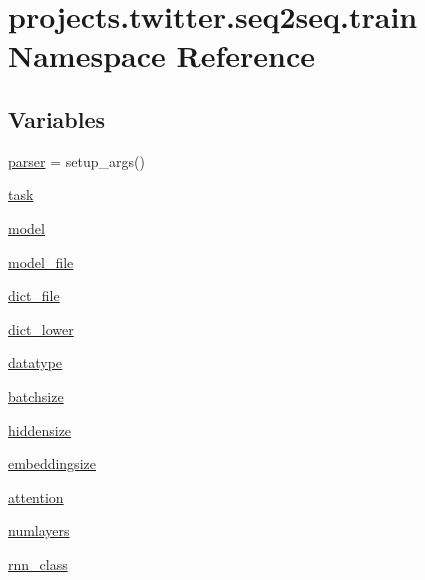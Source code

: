 \hypertarget{namespaceprojects_1_1twitter_1_1seq2seq_1_1train}{}\section{projects.\+twitter.\+seq2seq.\+train Namespace Reference}
\label{namespaceprojects_1_1twitter_1_1seq2seq_1_1train}
\subsection*{Variables}
\begin{DoxyCompactItemize}
\item 
\hyperlink{namespaceprojects_1_1twitter_1_1seq2seq_1_1train_a9e6a15f047bea69a82a938079cc0ba2f}{parser} = setup\+\_\+args()
\item 
\hyperlink{namespaceprojects_1_1twitter_1_1seq2seq_1_1train_a51cfbd999af26b059b5d5442c984be9b}{task}
\item 
\hyperlink{namespaceprojects_1_1twitter_1_1seq2seq_1_1train_a86896423f4d94c6bdd91ebced377ccec}{model}
\item 
\hyperlink{namespaceprojects_1_1twitter_1_1seq2seq_1_1train_a8bcf78f30268b40edf0e6df44b476a75}{model\+\_\+file}
\item 
\hyperlink{namespaceprojects_1_1twitter_1_1seq2seq_1_1train_ab00b37ad91423948f2d9bf2839b64316}{dict\+\_\+file}
\item 
\hyperlink{namespaceprojects_1_1twitter_1_1seq2seq_1_1train_ab2c85632a2a318851b9f675efc1ab4c3}{dict\+\_\+lower}
\item 
\hyperlink{namespaceprojects_1_1twitter_1_1seq2seq_1_1train_a9acdb1312a3787bcfb1e854c557fcaff}{datatype}
\item 
\hyperlink{namespaceprojects_1_1twitter_1_1seq2seq_1_1train_a80c8112773ded56fe439a3d97a3e790a}{batchsize}
\item 
\hyperlink{namespaceprojects_1_1twitter_1_1seq2seq_1_1train_a43dbbfc725c938ac40bbde95e0f85d5d}{hiddensize}
\item 
\hyperlink{namespaceprojects_1_1twitter_1_1seq2seq_1_1train_a069e63e4319bbbf8f442f20f21760c7e}{embeddingsize}
\item 
\hyperlink{namespaceprojects_1_1twitter_1_1seq2seq_1_1train_a51af6c3f45d7c28e7e90ece16206a11e}{attention}
\item 
\hyperlink{namespaceprojects_1_1twitter_1_1seq2seq_1_1train_a241b3896bf57f7eede097ac41f4e3b82}{numlayers}
\item 
\hyperlink{namespaceprojects_1_1twitter_1_1seq2seq_1_1train_ad02b8811b08973f6bf13280c07bb43fe}{rnn\+\_\+class}

\end{DoxyCompactItemize}

